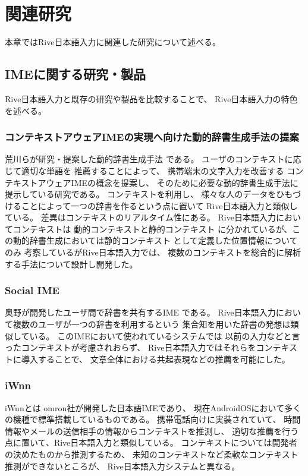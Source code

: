 \chapter{関連研究}
\label{chap:related}
本章ではRive日本語入力に関連した研究について述べる。

\newpage
\section{IMEに関する研究・製品}
Rive日本語入力と既存の研究や製品を比較することで、
Rive日本語入力の特色を述べる。

\subsection{コンテキストアウェアIMEの実現へ向けた動的辞書生成手法の提案}
荒川らが研究・提案した動的辞書生成手法\cite{dynamicdictionarygeneration}
である。
ユーザのコンテキストに応じて適切な単語を
推薦することによって、
携帯端末の文字入力を改善する
コンテキストアウェアIMEの概念を提案し、
そのために必要な動的辞書生成手法に提示している研究である。
コンテキストを利用し、
様々な人のデータをひもづけることによって一つの辞書を作るという点に置いて
Rive日本語入力と類似している。
差異はコンテキストのリアルタイム性にある。
Rive日本語入力においてコンテキストは
動的コンテキストと静的コンテキスト
に分かれているが、この動的辞書生成においては静的コンテキスト
として定義した位置情報についてのみ
考察しているがRive日本語入力では、
複数のコンテキストを総合的に解析する手法について設計し開発した。

\subsection{Social IME}
奥野が開発したユーザ間で辞書を共有するIME\cite{socialime}
である。
Rive日本語入力において複数のユーザが一つの辞書を利用するという
集合知を用いた辞書の発想は類似している。
このIMEにおいて使われているシステム\cite{奥野陽:2009-03-18}では
以前の入力などと言ったコンテキストが考慮されおらず、
Rive日本語入力ではそれらをコンテキストに導入することで、
文章全体における共起表現などの推薦を可能にした。

\subsection{iWnn}
iWnnとは\cite{iwnn}
omron社が開発した日本語IMEであり、
現在AndroidOSにおいて多くの機種で標準搭載しているものである。
携帯電話向けに実装されていて、
時間情報やメールの送信相手の情報からコンテキストを推測し、
適切な推薦を行う点に置いて、Rive日本語入力と類似している。
コンテキストについては開発者の決めたものから推測するため、
未知のコンテキストなど柔軟なコンテキスト推測ができないところが、
Rive日本語入力システムと異なる。

